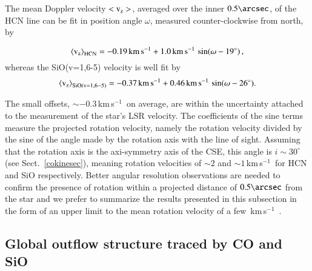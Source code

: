 \documentclass{aa}
\newcommand{\kms}{\,km\,s$^{-1}$~}
\begin{document}
The  mean Doppler velocity $<{\rm v_z}>$, averaged over the inner $0.5
\arcsec$, of the HCN line can be fit in position angle $\omega$,
measured counter-clockwise from north, by

\begin{equation}
  \left< {\rm v_z} \right>_{\rm HCN} = -0.19\,{\rm km\,s}^{-1} +
                                        1.0\,{\rm km\,s}^{-1}\, 
                                                     \sin(\omega-19^{\circ})\, ,
\label{hcnroteq}
\end{equation}  
whereas the SiO(v=1,6-5) velocity is well fit by
\begin{equation}
  \left< {\rm v_z} \right>_{\rm SiO(v=1,6-5)} = -0.37\,{\rm km\,s}^{-1} + 
                                               0.46\,{\rm km\,s}^{-1}\, 
                                                     \sin(\omega-26^{\circ}) .
\label{siov165roteq}
\end{equation}  

The small offsets, $\sim -0.3$\kms on average, are within the
uncertainty attached to the measurement of the star's LSR
velocity. The coefficients of the sine terms measure the projected
rotation velocity, namely the rotation velocity divided by the sine of
the angle made by the rotation axis with the line of sight. Assuming
that the rotation axis is the axi-symmetry axis of the CSE, this angle
is $i \sim 30^\circ$ (see Sect.~\ref{cokinesec}),  meaning rotation
velocities of $\sim 2$ and $\sim 1$\kms for HCN and SiO
respectively. Better angular resolution observations are needed to
confirm the presence of rotation within a projected distance of
$0.5\arcsec$ from the star and we prefer to summarize the results
presented in this subsection in the form of an upper limit to the mean
rotation velocity of a few \kms.

\subsection{Global outflow structure traced by CO and SiO}
\label{kinestrucsec}
\end{document}

